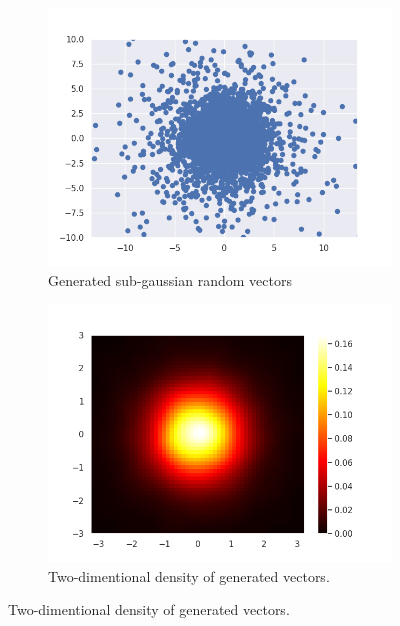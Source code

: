 \documentclass{article}
\begin{document}
	\begin{figure}\label{dwa}
		\centering
		\begin{subfigure}[H]{0.49\textwidth}
			\centering
			\includegraphics[width=\textwidth]{images/ex_2_alpha_stable_vector_simulation_sub_gaussian_SaS_catter}
			\caption{Generated sub-gaussian random vectors}\label{4}
		\end{subfigure}
		\hfill
		\begin{subfigure}[H]{0.49\textwidth}
			\centering
			\includegraphics[width=\textwidth]{images/ex_2_alpha_stable_vector_simulation_sub_gaussian_SaS_heatmap}
			\caption{Two-dimentional density of generated vectors.}\label{5}
		\end{subfigure}
	\end{figure}
	
\end{document}
